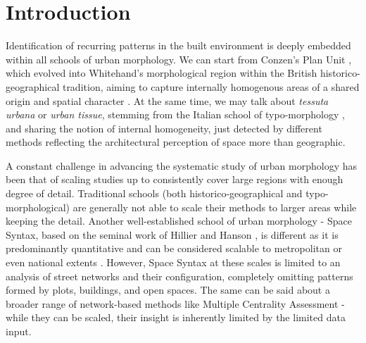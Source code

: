 \section{Introduction}
\label{sec:intro}

Identification of recurring patterns in the built environment is deeply embedded within
all schools of urban morphology. We can start from Conzen's Plan Unit \citep{conzen1960},
which evolved into Whitehand's morphological region within the British
historico-geographical tradition, aiming to capture internally homogenous areas of a
shared origin and spatial character \citep{oliveira2020}. At the same time, we may talk
about \textit{tessuta urbana} or \textit{urban tissue}, stemming from the Italian school
of typo-morphology \citep{caniggia2001}, and sharing the notion of internal homogeneity,
just detected by different methods reflecting the architectural perception of space more
than geographic. 

A constant challenge in advancing the systematic study of urban morphology has
been that of scaling studies up to consistently cover large regions with enough degree of
detail. Traditional schools (both
historico-geographical and typo-morphological) are generally not able to scale their
methods to larger areas while keeping the detail. Another well-established school of
urban morphology - Space Syntax, based on the seminal work of Hillier and Hanson
\citep{hillier1996}, is different as it is predominantly quantitative and can be considered scalable to metropolitan or even
national extents \citep{spacesyntaxlimited2018}. However, Space Syntax at these scales
is limited to an analysis of street networks and their configuration, completely
omitting patterns formed by plots, buildings, and open spaces. The same can be said
about a broader range of network-based methods like Multiple Centrality Assessment
\citep{porta2010} - while they can be scaled, their insight is inherently limited by the
limited data input.


